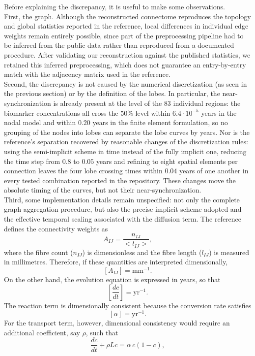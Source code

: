 Before explaining the discrepancy, it is useful to make some observations.\\
First, the graph. Although the reconstructed connectome reproduces the topology and global statistics reported in the reference, local differences in individual edge weights remain entirely possible, since part of the preprocessing pipeline had to be inferred from the public data rather than reproduced from a documented procedure. After validating our reconstruction against the published statistics, we retained this inferred preprocessing, which does not guarantee an entry-by-entry match with the adjacency matrix used in the reference.
\\
Second, the discrepancy is not caused by the numerical discretization (as seen in the previous section) or by the definition of the lobes. In particular, the near-synchronization is already present at the level of the $83$ individual regions: the biomarker concentrations all cross the $50\%$ level within $6.4\cdot10^{-5}$ years in the nodal model and within $0.20$ years in the finite element formulation, so no grouping of the nodes into lobes can separate the lobe curves by years. Nor is the reference's separation recovered by reasonable changes of the discretization rules: using the semi-implicit scheme in time instead of the fully implicit one, reducing the time step from $0.8$ to $0.05$ years and refining to eight spatial elements per connection leaves the four lobe crossing times within $0.04$ years of one another in every tested combination reported in the repository. These changes move the absolute timing of the curves, but not their near-synchronization.\\
Third, some implementation details remain unspecified: not only the complete graph-aggregation procedure, but also the precise implicit scheme adopted and the effective temporal scaling associated with the diffusion term. The reference defines the connectivity weights as
\[
A_{IJ}=\frac{n_{IJ}}{<l_{IJ}>},
\]
where the fibre count ($n_{IJ}$) is dimensionless and the fibre length ($l_{IJ}$) is measured in millimetres. Therefore, if these quantities are interpreted dimensionally,
\[
[A_{IJ}] = \mathrm{mm}^{-1}.
\]
On the other hand, the evolution equation is expressed in years, so that
\[
\left[\frac{dc}{dt}\right]=\mathrm{yr}^{-1}.
\]
The reaction term is dimensionally consistent because the conversion rate satisfies
\[
[\alpha]=\mathrm{yr}^{-1}.
\]
For the transport term, however, dimensional consistency would require an additional coefficient, say $\rho$, such that
\[
\frac{dc}{dt} +\rho Lc =
\alpha\,c(1-c),
\]
